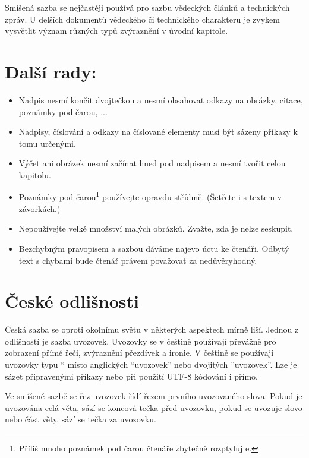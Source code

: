 \documentclass[czech,a4paper,10pt,twocolumn]{article}
\newcommand{\myuv}[1]{\quotedblbase#1\textquotedblleft}
\begin{document}
Smíšená sazba se nejčastěji používá pro sazbu vědeckých článků a technických zpráv. U delších dokumentů vědeckého či technického charakteru je zvykem vysvětlit význam různých typů zvýraznění v úvodní kapitole.

\section{Další rady:}\label{3}
\begin{itemize}
\item Nadpis nesmí končit dvojtečkou a nesmí obsahovat odkazy na obrázky, citace, poznámky pod čarou, ...

\item Nadpisy, číslování a odkazy na číslované elementy musí být sázeny příkazy k tomu určenými.

\item Výčet ani obrázek nesmí začínat hned pod nadpisem a nesmí tvořit celou kapitolu.

\item Poznámky pod čarou\footnote[1]{Příliš mnoho poznámek pod čarou čtenáře zbytečně rozptyluj
e.} používejte opravdu střídmě. (Šetřete i s textem v závorkách.)

\item Nepoužívejte velké množství malých obrázků. Zvažte, zda je nelze seskupit.

\item Bezchybným pravopisem a sazbou dáváme najevo úctu ke čtenáři. Odbytý text s chybami bude čtenář právem považovat za nedůvěryhodný.
\end{itemize}

\section{České odlišnosti}

Česká sazba se oproti okolnímu světu v některých aspektech mírně liší. Jednou z odlišností je sazba uvozovek. Uvozovky se v češtině používají převážně pro zobrazení přímé řeči, zvýraznění přezdívek a ironie. V češtině se používají uvozovky typu \myuv{9966} místo anglických {\textquotedblleft uvozovek\textquotedblright} nebo dvojitých ''uvozovek''. Lze je sázet připravenými příkazy nebo při použití UTF-8 kódování i přímo.

Ve smíšené sazbě se řez uvozovek řídí řezem prvního uvozovaného slova. Pokud je uvozována celá věta, sází se koncová tečka před uvozovku, pokud se uvozuje slovo nebo část věty, sází se tečka za uvozovku.
\end{document}
